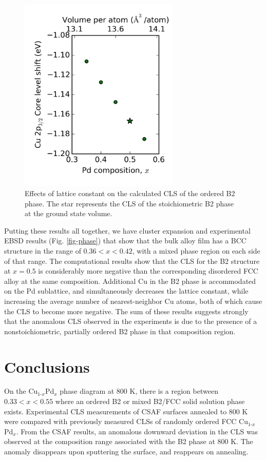 \documentclass[number, sort&compress, review, 12pt]{elsarticle}
\begin{document}
\begin{figure}[H]
\centering
\includegraphics[width=3in]{./images/strain.png}
\caption{\label{fig-clsvol}Effects of lattice constant on the calculated CLS of the ordered B2 phase. The star represents the CLS of the stoichiometric B2 phase at the ground state volume.}
\end{figure}

Putting these results all together, we have cluster expansion and experimental EBSD results (Fig. \ref{fig-phase}) that show that the bulk alloy film has a BCC structure in the range of $0.36 < x < 0.42$, with a mixed phase region on each side of that range. The computational results show that the CLS for the B2 structure at $x = 0.5$ is considerably more negative than the corresponding disordered FCC alloy at the same composition. Additional Cu in the B2 phase is accommodated on the Pd sublattice, and simultaneously decreases the lattice constant, while increasing the average number of nearest-neighbor Cu atoms, both of which cause the CLS to become more negative. The sum of these results suggests strongly that the anomalous CLS observed in the experiments is due to the presence of a nonstoichiometric, partially ordered B2 phase in that composition region.

\section{Conclusions}
\label{sec-4}
On the Cu$_{\text{1-}x}$Pd$_x$ phase diagram at 800 K, there is a region between $0.33 < x < 0.55$ where an ordered B2 or mixed B2/FCC solid solution phase exists. Experimental CLS measurements of CSAF surfaces annealed to 800 K were compared with previously measured CLSs of randomly ordered FCC Cu$_{\text{1-}x}$Pd$_x$. From the CSAF results, an anomalous downward deviation in the CLS was observed at the composition range associated with the B2 phase at 800 K. The anomaly disappears upon sputtering the surface, and reappears on annealing.
\end{document}

